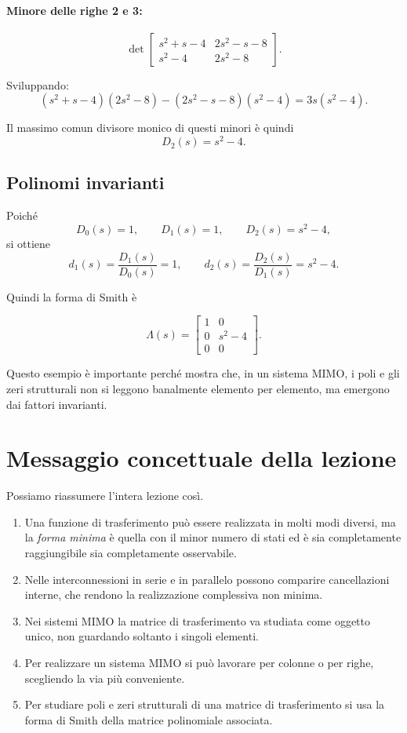 \paragraph{Minore delle righe 2 e 3:}
\[
\det
\begin{bmatrix}
s^2+s-4 & 2s^2-s-8\\
s^2-4 & 2s^2-8
\end{bmatrix}.
\]

Sviluppando:
\[
(s^2+s-4)(2s^2-8)-(2s^2-s-8)(s^2-4)
=
3s(s^2-4).
\]

Il massimo comun divisore monico di questi minori è quindi
\[
D_2(s)=s^2-4.
\]

\subsection{Polinomi invarianti}

Poiché
\[
D_0(s)=1,\qquad D_1(s)=1,\qquad D_2(s)=s^2-4,
\]
si ottiene
\[
d_1(s)=\frac{D_1(s)}{D_0(s)}=1,
\qquad
d_2(s)=\frac{D_2(s)}{D_1(s)}=s^2-4.
\]

Quindi la forma di Smith è

\[
\Lambda(s)=
\begin{bmatrix}
1 & 0\\
0 & s^2-4\\
0 & 0
\end{bmatrix}.
\]

\medskip

Questo esempio è importante perché mostra che, in un sistema MIMO, i poli e gli zeri strutturali non si leggono banalmente elemento per elemento, ma emergono dai fattori invarianti.

\bigskip

\section{Messaggio concettuale della lezione}

Possiamo riassumere l'intera lezione così.

\begin{enumerate}
    \item Una funzione di trasferimento può essere realizzata in molti modi diversi, ma la \emph{forma minima} è quella con il minor numero di stati ed è sia completamente raggiungibile sia completamente osservabile.
    \item Nelle interconnessioni in serie e in parallelo possono comparire cancellazioni interne, che rendono la realizzazione complessiva non minima.
    \item Nei sistemi MIMO la matrice di trasferimento va studiata come oggetto unico, non guardando soltanto i singoli elementi.
    \item Per realizzare un sistema MIMO si può lavorare per colonne o per righe, scegliendo la via più conveniente.
    \item Per studiare poli e zeri strutturali di una matrice di trasferimento si usa la forma di Smith della matrice polinomiale associata.
\end{enumerate}

